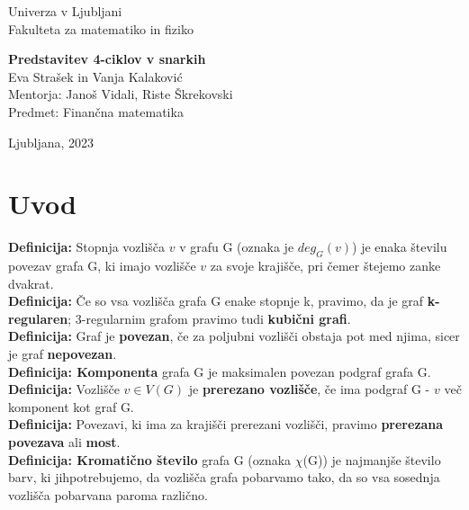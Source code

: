 \documentclass[a4paper,12pt]{article}
\begin{document}
\thispagestyle{empty}
{\large
\noindent Univerza v Ljubljani\\[1mm]
Fakulteta za matematiko in fiziko\\[5mm]}
\vfill

\begin{center}{\Large
{\bf Predstavitev 4-ciklov v snarkih}\\[2mm]
Eva Strašek in Vanja Kalaković\\[10mm]
Mentorja: Janoš Vidali, Riste Škrekovski\\[2mm]
Predmet: Finančna matematika \\[2mm]}
\end{center}
\vfill

{\large
Ljubljana, 2023}
\pagebreak

\section{Uvod}

\noindent \textbf{Definicija:} Stopnja vozlišča $v$ v grafu G (oznaka je $deg_G(v)$)
je enaka številu povezav grafa G, ki imajo vozlišče $v$ za svoje krajišče,
pri čemer štejemo zanke dvakrat.\\

\noindent \textbf{Definicija:} Če so vsa vozlišča grafa G enake stopnje
k, pravimo, da je graf \textbf{k-regularen}; 3-regularnim grafom 
pravimo tudi \textbf{kubični grafi}.\\

\noindent \textbf{Definicija:} Graf je \textbf{povezan}, če za poljubni vozlišči obstaja
pot med njima, sicer je graf \textbf{nepovezan}.\\

\noindent \textbf{Definicija: Komponenta} grafa G je maksimalen povezan podgraf
grafa G.\\

\noindent \textbf{Definicija:} Vozlišče $v \in V(G)$ je \textbf{prerezano vozlišče}, če ima 
podgraf G - $v$ več komponent kot graf G.\\

\noindent \textbf{Definicija:} Povezavi, ki ima za krajišči prerezani vozlišči,
pravimo \textbf{prerezana povezava} ali \textbf{most}.\\

\noindent \textbf{Definicija: Kromatično število} grafa G (oznaka $\chi$(G)) je najmanjše število barv, ki jihpotrebujemo, da vozlišča grafa pobarvamo tako, da so vsa sosednja
vozlišča pobarvana paroma različno.\\
\end{document}
